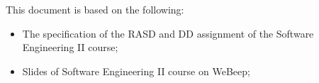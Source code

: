 This document is based on the following:
\begin{itemize}
    \item The specification of the RASD and DD assignment of the Software Engineering II course;
    \item Slides of Software Engineering II course on WeBeep; 
\end{itemize}